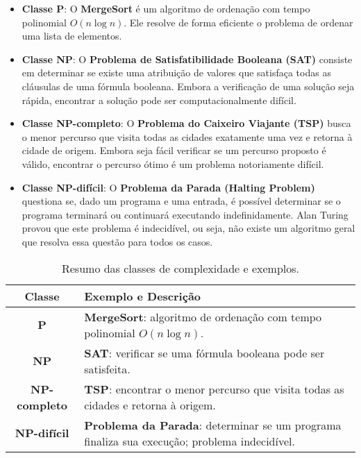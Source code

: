 \documentclass[12pt,oneside,a4paper]{report}
\begin{document}
\begin{itemize}
    \item \textbf{Classe P}: O \textbf{MergeSort} é um algoritmo de ordenação com tempo polinomial \(O(n \log n)\). Ele resolve de forma eficiente o problema de ordenar uma lista de elementos.
    
    \item \textbf{Classe NP}: O \textbf{Problema de Satisfatibilidade Booleana (SAT)} consiste em determinar se existe uma atribuição de valores que satisfaça todas as cláusulas de uma fórmula booleana. Embora a verificação de uma solução seja rápida, encontrar a solução pode ser computacionalmente difícil.
    
    \item \textbf{Classe NP-completo}: O \textbf{Problema do Caixeiro Viajante (TSP)} busca o menor percurso que visita todas as cidades exatamente uma vez e retorna à cidade de origem. Embora seja fácil verificar se um percurso proposto é válido, encontrar o percurso ótimo é um problema notoriamente difícil.
    
    \item \textbf{Classe NP-difícil}: O \textbf{Problema da Parada (Halting Problem)} questiona se, dado um programa e uma entrada, é possível determinar se o programa terminará ou continuará executando indefinidamente. Alan Turing provou que este problema é indecidível, ou seja, não existe um algoritmo geral que resolva essa questão para todos os casos.
\end{itemize}

\begin{table}[h]
\centering
\begin{tabular}{|c|p{8cm}|}
\hline
\textbf{Classe} & \textbf{Exemplo e Descrição} \\ \hline
\textbf{P} & \textbf{MergeSort}: algoritmo de ordenação com tempo polinomial \(O(n \log n)\). \\ \hline
\textbf{NP} & \textbf{SAT}: verificar se uma fórmula booleana pode ser satisfeita. \\ \hline
\textbf{NP-completo} & \textbf{TSP}: encontrar o menor percurso que visita todas as cidades e retorna à origem. \\ \hline
\textbf{NP-difícil} & \textbf{Problema da Parada}: determinar se um programa finaliza sua execução; problema indecidível. \\ \hline
\end{tabular}
\caption{Resumo das classes de complexidade e exemplos.}
\end{table}
\end{document}
